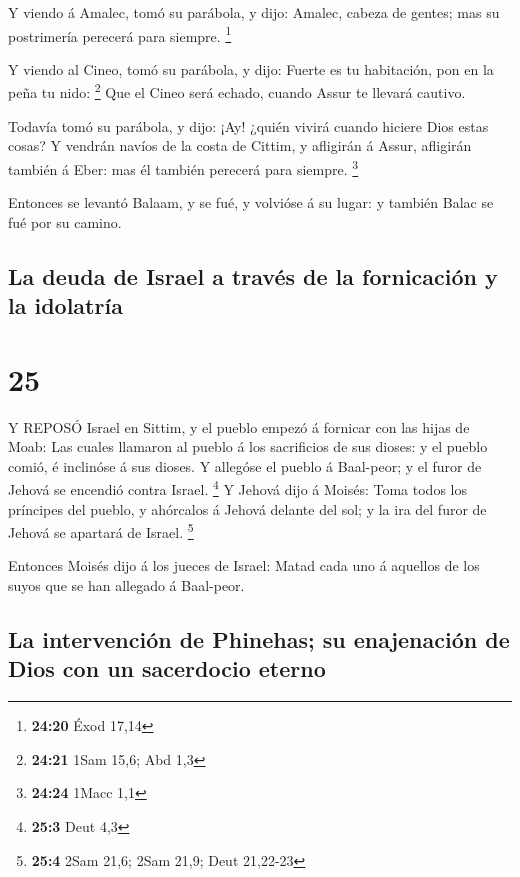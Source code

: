  Y viendo á Amalec, tomó su parábola, y dijo: Amalec,
cabeza de gentes; mas su postrimería perecerá para siempre. \footnote{\textbf{24:20}
  Éxod 17,14}

 Y viendo al Cineo, tomó su parábola, y dijo: Fuerte es tu
habitación, pon en la peña tu nido: \footnote{\textbf{24:21} 1Sam 15,6;
  Abd 1,3}  Que el Cineo será echado, cuando Assur te
llevará cautivo.

 Todavía tomó su parábola, y dijo: ¡Ay! ¿quién vivirá
cuando hiciere Dios estas cosas?  Y vendrán navíos de la
costa de Cittim, y afligirán á Assur, afligirán también á Eber: mas él
también perecerá para siempre. \footnote{\textbf{24:24} 1Macc 1,1}

 Entonces se levantó Balaam, y se fué, y volvióse á su
lugar: y también Balac se fué por su camino.

\hypertarget{la-deuda-de-israel-a-travuxe9s-de-la-fornicaciuxf3n-y-la-idolatruxeda}{%
\subsection{La deuda de Israel a través de la fornicación y la
idolatría}\label{la-deuda-de-israel-a-travuxe9s-de-la-fornicaciuxf3n-y-la-idolatruxeda}}

\hypertarget{section-24}{%
\section{25}\label{section-24}}

 Y REPOSÓ Israel en Sittim, y el pueblo empezó á fornicar
con las hijas de Moab:  Las cuales llamaron al pueblo á los
sacrificios de sus dioses: y el pueblo comió, é inclinóse á sus dioses.
 Y allegóse el pueblo á Baal-peor; y el furor de Jehová se
encendió contra Israel. \footnote{\textbf{25:3} Deut 4,3}  Y
Jehová dijo á Moisés: Toma todos los príncipes del pueblo, y ahórcalos á
Jehová delante del sol; y la ira del furor de Jehová se apartará de
Israel. \footnote{\textbf{25:4} 2Sam 21,6; 2Sam 21,9; Deut 21,22-23}

 Entonces Moisés dijo á los jueces de Israel: Matad cada uno
á aquellos de los suyos que se han allegado á Baal-peor.

\hypertarget{la-intervenciuxf3n-de-phinehas-su-enajenaciuxf3n-de-dios-con-un-sacerdocio-eterno}{%
\subsection{La intervención de Phinehas; su enajenación de Dios con un
sacerdocio
eterno}\label{la-intervenciuxf3n-de-phinehas-su-enajenaciuxf3n-de-dios-con-un-sacerdocio-eterno}}

